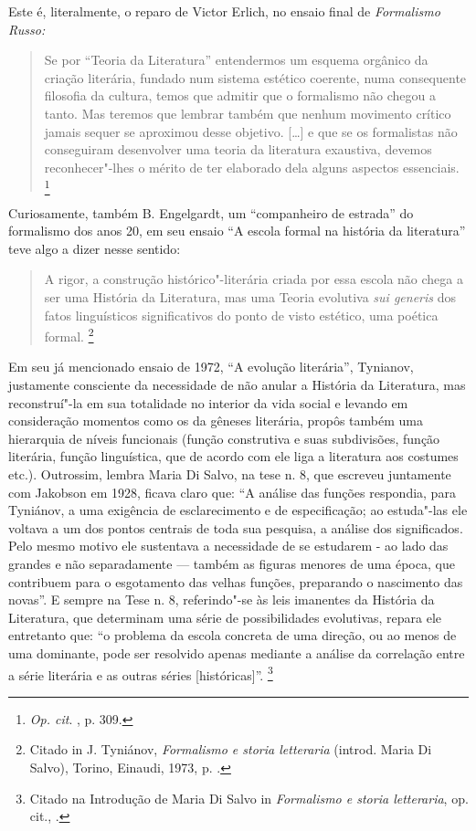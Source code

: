Este é, literalmente, o reparo de Victor Erlich, no ensaio final de
\emph{Formalismo Russo:}

\begin{quote}
Se por ``Teoria da Literatura'' entendermos um esquema orgânico da
criação literária, fundado num sistema estético coerente, numa
consequente filosofia da cultura, temos que admitir que o formalismo não
chegou a tanto. Mas teremos que lembrar também que nenhum movimento
crítico jamais sequer se aproximou desse objetivo. {[}\ldots{}{]} e que se os
formalistas não conseguiram desenvolver uma teoria da literatura
exaustiva, devemos reconhecer"-lhes o mérito de ter elaborado dela alguns
aspectos essenciais. \footnote{\emph{Op. cit}. , p. 309.}
\end{quote}

Curiosamente, também B. Engelgardt, um ``companheiro de estrada'' do
formalismo dos anos 20, em seu ensaio ``A escola formal na história da
literatura'' teve algo a dizer nesse sentido:

\begin{quote}
A rigor, a construção histórico"-literária criada por essa escola não
chega a ser uma História da Literatura, mas uma Teoria evolutiva
\emph{sui generis} dos fatos linguísticos significativos do ponto de
visto estético, uma poética formal. \footnote{Citado in J. Tyniánov,
  \emph{Formalismo e storia letteraria} (introd. Maria Di Salvo),
  Torino, Einaudi, 1973, p. .}
\end{quote}

Em seu já mencionado ensaio de 1972, ``A evolução literária'', Tynianov,
justamente consciente da necessidade de não anular a História da
Literatura, mas reconstruí"-la em sua totalidade no interior da vida
social e levando em consideração momentos como os da gêneses literária,
propôs também uma hierarquia de níveis funcionais (função construtiva e
suas subdivisões, função literária, função linguística, que de acordo
com ele liga a literatura aos costumes etc.). Outrossim, lembra Maria Di
Salvo, na tese n. 8, que escreveu juntamente com Jakobson em 1928,
ficava claro que: ``A análise das funções respondia, para Tyniánov, a
uma exigência de esclarecimento e de especificação; ao estuda"-las ele
voltava a um dos pontos centrais de toda sua pesquisa, a análise dos
significados. Pelo mesmo motivo ele sustentava a necessidade de se
estudarem - ao lado das grandes e não separadamente --- também as figuras
menores de uma época, que contribuem para o esgotamento das velhas
funções, preparando o nascimento das novas''. E sempre na Tese n. 8,
referindo"-se às leis imanentes da História da Literatura, que determinam
uma série de possibilidades evolutivas, repara ele entretanto que: ``o
problema da escola concreta de uma direção, ou ao menos de uma
dominante, pode ser resolvido apenas mediante a análise da correlação
entre a série literária e as outras séries {[}históricas{]}''.
\footnote{Citado na Introdução de Maria Di Salvo in \emph{Formalismo e
  storia letteraria}, op. cit., .}

